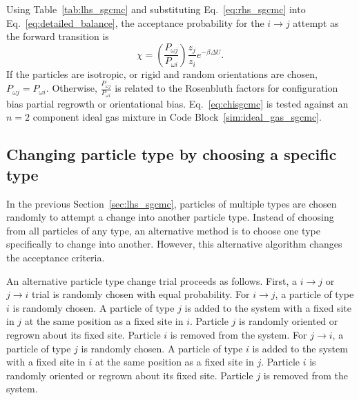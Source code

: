 \documentclass[
  9pt,
  bestpractices,
]{livecoms}
\begin{document}
Using Table~\ref{tab:lhs_sgcmc} and substituting Eq.~\ref{eq:rhs_sgcmc} into Eq.~\ref{eq:detailed_balance}, the acceptance probability for the $i\rightarrow j$ attempt as the forward transition is
\begin{equation}
\chi = \left(\frac{P_{\omega j}}{P_{\omega i}}\right)\frac{z_j}{z_i}e^{-\beta\Delta U}.
\label{eq:chisgcmc}
\end{equation}
If the particles are isotropic, or rigid and random orientations are chosen, $P_{\omega j}=P_{\omega i}$.
Otherwise, $\frac{P_{\omega j}}{P_{\omega i}}$ is related to the Rosenbluth factors for configuration bias partial regrowth or orientational bias.
Eq.~\ref{eq:chisgcmc} is tested against an $n=2$ component ideal gas mixture in Code Block~\ref{sim:ideal_gas_sgcmc}.

\begin{figure}

\end{figure}

\subsection{\label{sec:lhs_sgcmc_alt}Changing particle type by choosing a specific type}

In the previous Section~\ref{sec:lhs_sgcmc}, particles of multiple types are chosen randomly to attempt a change into another particle type.
Instead of choosing from all particles of any type, an alternative method is to choose one type specifically to change into another.
However, this alternative algorithm changes the acceptance criteria.

An alternative particle type change trial proceeds as follows.
First, a $i \rightarrow j$ or $j \rightarrow i$ trial is randomly chosen with equal probability.
For $i \rightarrow j$, a particle of type $i$ is randomly chosen.
A particle of type $j$ is added to the system with a fixed site in $j$ at the same position as a fixed site in $i$.
Particle $j$ is randomly oriented or regrown about its fixed site.
Particle $i$ is removed from the system.
For $j \rightarrow i$, a particle of type $j$ is randomly chosen.
A particle of type $i$ is added to the system with a fixed site in $i$ at the same position as a fixed site in $j$.
Particle $i$ is randomly oriented or regrown about its fixed site.
Particle $j$ is removed from the system.
\end{document}
